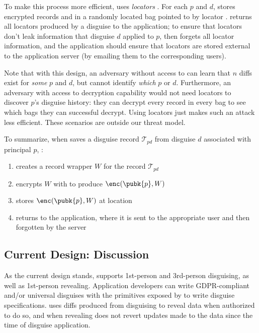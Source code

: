 To make this process more efficient, \sys uses \emph{locators }. For each $p$ and $d$,
\sys stores encrypted records  and  in a randomly located bag pointed to by
locator . \sys returns all locators produced by a disguise to the application; to ensure
that locators don't leak information that disguise $d$ applied to $p$, \sys then forgets all locator
information, and the application should ensure that locators are stored external to the application
server (\eg by emailing them to the corresponding users).

Note that with this design, an adversary without access to  can learn that $n$ diffs exist
for \emph{some} $p$ and $d$, but cannot identify \emph{which} $p$ or $d$.
%
Furthermore, an adversary with access to decryption capability  would not need locators to
discover $p$'s disguise history: they can decrypt every record in every bag to see which bags they
can successful decrypt. Using locators just makes such an attack less efficient.
%
These scenarios are outside our threat model.


To summarize, when \sys saves a disguise record $\mathcal{T}_{pd}$ from disguise $d$ associated with principal $p$, \sys:
\begin{enumerate}
    \item creates a record wrapper $W$ for the record $\mathcal{T}_{pd}$
    \item encrypts $W$ with  to produce $\enc(\pubk{p}, W)$
    \item stores $\enc(\pubk{p}, W)$ at location 
    \item returns  to the application, where it is sent to the appropriate user and then
        forgotten by the server
\end{enumerate}

\iffalse
\subsection{Current Design: Discussion}
As the current design stands, \sys supports 1st-person and 3rd-person disguising, as well as
1st-person revealing.
%
Application developers can write GDPR-compliant and/or universal disguises with the primitives
exposed by \sys to write disguise specifications.
%
\sys uses diffs produced from disguising to reveal data when authorized to do so, and when
revealing does not revert updates made to the data since the time of disguise application.

